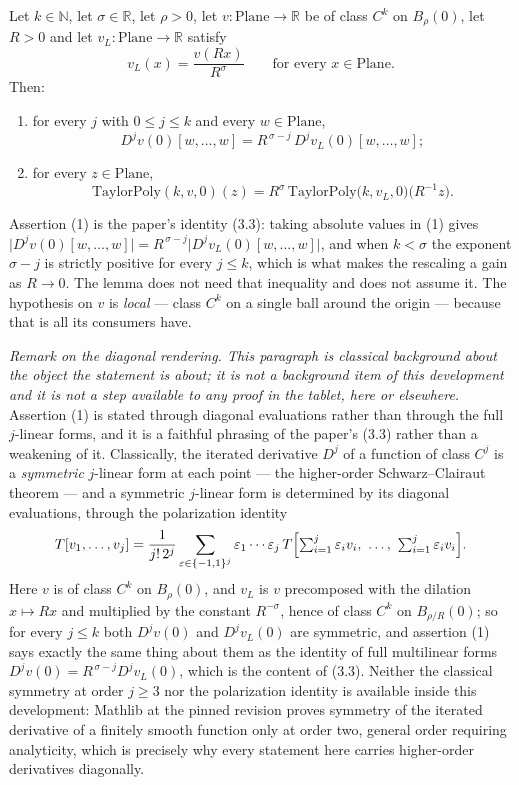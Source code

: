 \begin{lemma}
Let $k\in\mathbb{N}$, let $\sigma\in\mathbb{R}$, let $\rho>0$, let
$v\colon\mathrm{Plane}\to\mathbb{R}$ be of class $C^{k}$ on $B_{\rho}(0)$, let $R>0$ and let
$v_L\colon\mathrm{Plane}\to\mathbb{R}$ satisfy
\[
  v_L(x)=\frac{v(Rx)}{R^{\sigma}}\qquad\text{for every }x\in\mathrm{Plane}.
\]
Then:
\begin{enumerate}
\item for every $j$ with $0\le j\le k$ and every $w\in\mathrm{Plane}$,
\[
  D^{j}v(0)[w,\ldots,w]=R^{\,\sigma-j}\,D^{j}v_L(0)[w,\ldots,w];
\]
\item for every $z\in\mathrm{Plane}$,
\[
  \mathrm{TaylorPoly}(k,v,0)(z)=R^{\sigma}\,\mathrm{TaylorPoly}\bigl(k,v_L,0\bigr)
    \bigl(R^{-1}z\bigr).
\]
\end{enumerate}
Assertion (1) is the paper's identity (3.3): taking absolute values in (1) gives
$\lvert D^{j}v(0)[w,\ldots,w]\rvert=R^{\,\sigma-j}\lvert D^{j}v_L(0)[w,\ldots,w]\rvert$, and
when $k<\sigma$ the exponent $\sigma-j$ is strictly positive for every $j\le k$, which is what
makes the rescaling a gain as $R\to0$.  The lemma does not need that inequality and does not
assume it.  The hypothesis on $v$ is \emph{local} --- class $C^{k}$ on a single ball around the
origin --- because that is all its consumers have.

\medskip\noindent\emph{Remark on the diagonal rendering.  This paragraph is classical background
about the object the statement is about; it is not a background item of this development and it is not a
step available to any proof in the tablet, here or elsewhere.}  Assertion (1) is stated through
diagonal evaluations rather than through the full $j$-linear forms, and it is a faithful
phrasing of the paper's (3.3) rather than a weakening of it.  Classically, the
iterated derivative $D^{j}$ of a function of class $C^{j}$ is a \emph{symmetric} $j$-linear
form at each point --- the higher-order Schwarz--Clairaut theorem --- and a symmetric
$j$-linear form is determined by its diagonal evaluations, through the polarization identity
\[
  T[v_1,\ldots,v_j]=\frac{1}{j!\,2^{j}}\sum_{\varepsilon\in\{-1,1\}^{j}}
    \varepsilon_1\cdots\varepsilon_j\,
    T\Bigl[\textstyle\sum_{i=1}^{j}\varepsilon_iv_i,\ \ldots,\ \sum_{i=1}^{j}\varepsilon_iv_i\Bigr].
\]
Here $v$ is of class $C^{k}$ on $B_{\rho}(0)$, and $v_L$ is $v$ precomposed with the dilation
$x\mapsto Rx$ and multiplied by the constant $R^{-\sigma}$, hence of class $C^{k}$ on
$B_{\rho/R}(0)$; so for every $j\le k$ both $D^{j}v(0)$ and $D^{j}v_L(0)$ are symmetric, and
assertion (1) says exactly the same thing about them as the identity of full multilinear forms
$D^{j}v(0)=R^{\,\sigma-j}D^{j}v_L(0)$, which is the content of (3.3).  Neither the
classical symmetry at order $j\ge3$ nor the polarization identity is available inside this
development: Mathlib at the pinned revision proves symmetry of the iterated derivative of a
finitely smooth function only at order two, general order requiring analyticity, which is
precisely why every statement here carries higher-order derivatives diagonally.
\end{lemma}
